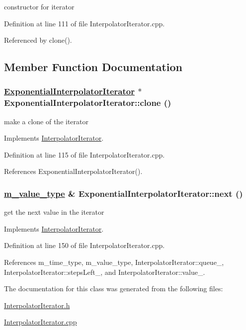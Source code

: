 constructor for iterator 



Definition at line 111 of file Interpolator\-Iterator.cpp.

Referenced by clone().

\subsection{Member Function Documentation}
\hypertarget{classExponentialInterpolatorIterator_a1}{
\subsubsection[clone]{\setlength{\rightskip}{0pt plus 5cm}\hyperlink{classExponentialInterpolatorIterator}{Exponential\-Interpolator\-Iterator} $\ast$ Exponential\-Interpolator\-Iterator::clone ()}}
\label{classExponentialInterpolatorIterator_a1}


make a clone of the iterator 



Implements \hyperlink{classInterpolatorIterator_a2}{Interpolator\-Iterator}.

Definition at line 115 of file Interpolator\-Iterator.cpp.

References Exponential\-Interpolator\-Iterator().\hypertarget{classExponentialInterpolatorIterator_a2}{
\subsubsection[next]{\setlength{\rightskip}{0pt plus 5cm}\hyperlink{Types_8h_a3}{m\_\-value\_\-type} \& Exponential\-Interpolator\-Iterator::next ()}}
\label{classExponentialInterpolatorIterator_a2}


get the next value in the iterator 



Implements \hyperlink{classInterpolatorIterator_a4}{Interpolator\-Iterator}.

Definition at line 150 of file Interpolator\-Iterator.cpp.

References m\_\-time\_\-type, m\_\-value\_\-type, Interpolator\-Iterator::queue\_\-, Interpolator\-Iterator::steps\-Left\_\-, and Interpolator\-Iterator::value\_\-.

The documentation for this class was generated from the following files:\begin{CompactItemize}
\item 
\hyperlink{InterpolatorIterator_8h}{Interpolator\-Iterator.h}\item 
\hyperlink{InterpolatorIterator_8cpp}{Interpolator\-Iterator.cpp}\end{CompactItemize}

